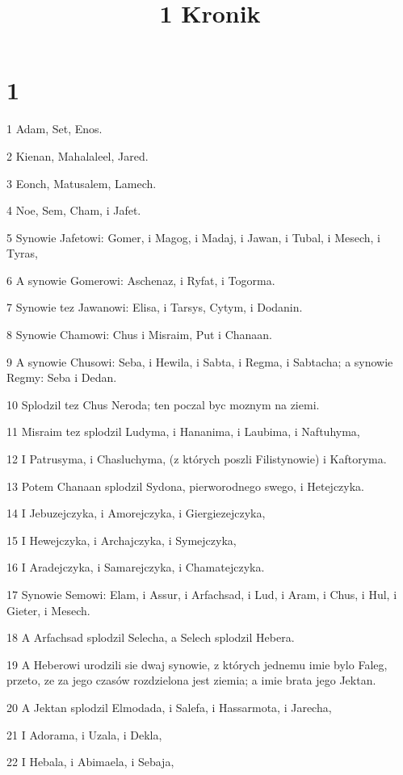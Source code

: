 

\title{1 Kronik}


\chapter{1}

\par 1 Adam, Set, Enos.
\par 2 Kienan, Mahalaleel, Jared.
\par 3 Eonch, Matusalem, Lamech.
\par 4 Noe, Sem, Cham, i Jafet.
\par 5 Synowie Jafetowi: Gomer, i Magog, i Madaj, i Jawan, i Tubal, i Mesech, i Tyras,
\par 6 A synowie Gomerowi: Aschenaz, i Ryfat, i Togorma.
\par 7 Synowie tez Jawanowi: Elisa, i Tarsys, Cytym, i Dodanin.
\par 8 Synowie Chamowi: Chus i Misraim, Put i Chanaan.
\par 9 A synowie Chusowi: Seba, i Hewila, i Sabta, i Regma, i Sabtacha; a synowie Regmy: Seba i Dedan.
\par 10 Splodzil tez Chus Neroda; ten poczal byc moznym na ziemi.
\par 11 Misraim tez splodzil Ludyma, i Hananima, i Laubima, i Naftuhyma,
\par 12 I Patrusyma, i Chasluchyma, (z których poszli Filistynowie) i Kaftoryma.
\par 13 Potem Chanaan splodzil Sydona, pierworodnego swego, i Hetejczyka.
\par 14 I Jebuzejczyka, i Amorejczyka, i Giergiezejczyka,
\par 15 I Hewejczyka, i Archajczyka, i Symejczyka,
\par 16 I Aradejczyka, i Samarejczyka, i Chamatejczyka.
\par 17 Synowie Semowi: Elam, i Assur, i Arfachsad, i Lud, i Aram, i Chus, i Hul, i Gieter, i Mesech.
\par 18 A Arfachsad splodzil Selecha, a Selech splodzil Hebera.
\par 19 A Heberowi urodzili sie dwaj synowie, z których jednemu imie bylo Faleg, przeto, ze za jego czasów rozdzielona jest ziemia; a imie brata jego Jektan.
\par 20 A Jektan splodzil Elmodada, i Salefa, i Hassarmota, i Jarecha,
\par 21 I Adorama, i Uzala, i Dekla,
\par 22 I Hebala, i Abimaela, i Sebaja,
